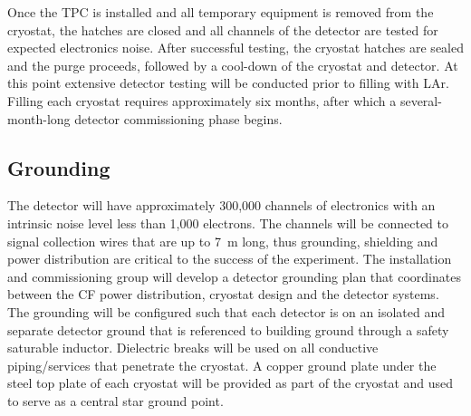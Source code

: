 Once the TPC is installed and all temporary equipment is removed from
the cryostat, the hatches are closed and all channels of the
detector are tested for expected electronics noise. After
successful testing, the cryostat hatches are sealed and the purge
proceeds, followed by a cool-down of the cryostat and detector.
At this point extensive detector testing will be conducted prior to 
filling with LAr. Filling each  cryostat 
requires approximately six months, after which a several-month-long
detector commissioning phase begins.

\subsection{Grounding}
\label{sec:detectors-fd-ref-install-ground}

The detector will have approximately 300,000 channels of electronics with
an intrinsic noise level less than 1,000 electrons. The channels will
be connected to signal collection wires that are up to 7~m long, thus
grounding, shielding and power distribution are critical to the success
of the experiment.
The installation and commissioning group will develop a detector
grounding plan that coordinates between the CF
power distribution, cryostat design and the detector systems.   The grounding will be configured such that each
detector is on an isolated and separate detector ground that is
referenced to building ground through a safety saturable inductor.
Dielectric breaks will be used on all conductive piping/services that
penetrate the cryostat.  A copper ground plate under the steel top
plate of each cryostat will be provided as part of the cryostat and
used to serve as a central star ground point.


